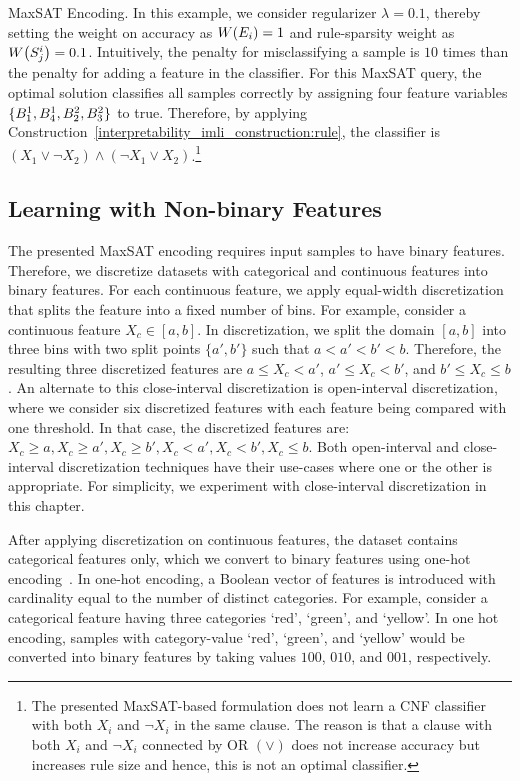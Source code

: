 \begin{example}{MaxSAT Encoding.}
In this example, we consider regularizer $ \lambda = 0.1 $, thereby setting the weight on accuracy as $ W \! \left( E_i \right) = 1 $ and rule-sparsity weight as $ W \! \left( S_j^i \right) = 0.1 $. Intuitively, the penalty for misclassifying a sample is $ 10 $ times than the penalty for adding a feature in the classifier. For this MaxSAT query, the optimal solution classifies all samples correctly by assigning four feature variables $ \{B^1_1, B^1_4, B^2_2, B^2_3\} $ to true. Therefore, by applying Construction~\ref{interpretability_imli_construction:rule}, the classifier is $ (X_1 \vee \neg X_2)  \wedge (\neg X_1 \vee X_2) $.\footnote{The presented MaxSAT-based formulation does not learn a CNF classifier with both $ X_i $ and $ \neg X_i $ in the same clause. The reason is that a clause with both $ X_i $ and $ \neg X_i $ connected by OR $ (\vee) $ does not increase accuracy but increases rule size and hence, this is not an optimal classifier.}
	
\end{example}
	
	
\subsection{Learning with Non-binary Features}
	\label{interpretability_imli_sec:non-binary}
	The presented MaxSAT encoding requires input samples to have binary features. Therefore, we discretize datasets with categorical and continuous features into binary features. For each continuous feature, we apply equal-width discretization that splits the feature into a fixed number of bins. For example, consider a continuous feature $ X_c \in [a,b] $. In discretization, we split the domain $ [a,b] $ into three bins with two split points $ \{a',b'\} $ such that $ a<a'<b'<b $.  Therefore, the resulting three discretized features are $ { a \le X_c < a'} $, $ {a' \le X_c < b'} $, and $ { b' \le X_c  \le b } $. An alternate to this close-interval discretization is open-interval discretization, where we consider six discretized features with each feature being compared with one threshold. In that case, the discretized features are: $ X_c \ge a, X_c \ge a', X_c \ge b', X_c < a', X_c < b', X_c \le b $. Both open-interval and close-interval discretization techniques have their use-cases where one or the other is appropriate. For simplicity, we experiment with close-interval discretization in this chapter.
	
	After applying discretization on continuous features, the dataset contains categorical features only, which we convert to binary features using one-hot encoding~\cite{lakkaraju2019faithful}. In one-hot encoding, a Boolean vector of features is introduced with cardinality equal to the number of distinct categories. For example, consider a categorical feature having three categories `red', `green', and `yellow'. In one hot encoding, samples with category-value `red', `green', and `yellow' would be converted into binary features by taking values $ 100 $, $ 010 $, and $ 001 $, respectively. 
	
